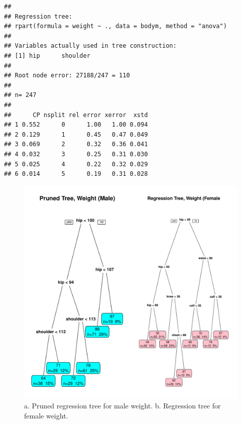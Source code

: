 \documentclass[11pt]{article}\usepackage[]{graphicx}\usepackage[]{color}
\makeatletter
\def\maxwidth{ %
  \ifdim\Gin@nat@width>\linewidth
    \linewidth
  \else
    \Gin@nat@width
  \fi
}
\newenvironment{kframe}{%
 \def\at@end@of@kframe{}%
 \ifinner\ifhmode%
  \def\at@end@of@kframe{\end{minipage}}%
  \begin{minipage}{\columnwidth}%
 \fi\fi%
 \def\FrameCommand##1{\hskip\@totalleftmargin \hskip-\fboxsep
 \colorbox{shadecolor}{##1}\hskip-\fboxsep
     \hskip-\linewidth \hskip-\@totalleftmargin \hskip\columnwidth}%
 \MakeFramed {\advance\hsize-\width
   \@totalleftmargin\z@ \linewidth\hsize
   \@setminipage}}%
 {\par\unskip\endMakeFramed%
 \at@end@of@kframe}
\newenvironment{knitrout}{}{} %
\makeatother
\begin{document}
\begin{knitrout}
\color{fgcolor}\begin{kframe}
\begin{verbatim}
## 
## Regression tree:
## rpart(formula = weight ~ ., data = bodym, method = "anova")
## 
## Variables actually used in tree construction:
## [1] hip      shoulder
## 
## Root node error: 27188/247 = 110
## 
## n= 247 
## 
##      CP nsplit rel error xerror  xstd
## 1 0.552      0      1.00   1.00 0.094
## 2 0.129      1      0.45   0.47 0.049
## 3 0.069      2      0.32   0.36 0.041
## 4 0.032      3      0.25   0.31 0.030
## 5 0.025      4      0.22   0.32 0.029
## 6 0.014      5      0.19   0.31 0.028
\end{verbatim}
\end{kframe}
\end{knitrout}


\begin{figure}
\begin{knitrout}
\color{fgcolor}
\includegraphics[width=\maxwidth]{figure/mtrees} 

\end{knitrout}

\caption{a. Pruned regression tree for male weight. b. Regression tree for female weight.}
\label{fig:two}
\end{figure}
\end{document}

